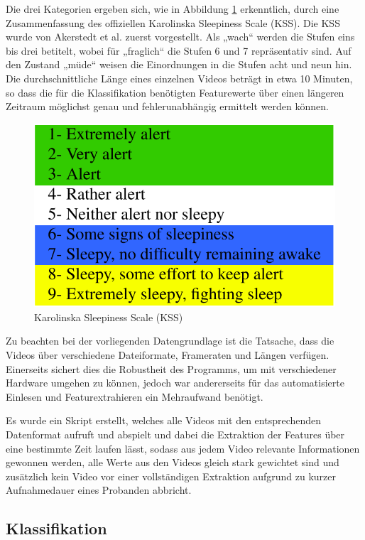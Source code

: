 Die drei Kategorien ergeben sich, wie in Abbildung \ref{fig:KSSScale} erkenntlich, durch eine Zusammenfassung des offiziellen Karolinska Sleepiness Scale (KSS). Die KSS wurde von Akerstedt et al. \cite{AK90} zuerst vorgestellt. Als „wach“ werden die Stufen eins bis drei betitelt, wobei für „fraglich“ die Stufen 6 und 7 repräsentativ sind. Auf den Zustand „müde“ weisen die Einordnungen in die Stufen acht und neun hin. Die durchschnittliche Länge eines einzelnen Videos beträgt in etwa 10 Minuten, so dass die für die Klassifikation benötigten Featurewerte über einen längeren Zeitraum möglichst genau und fehlerunabhängig ermittelt werden können. 

\begin{figure}
\centering
\includegraphics[scale=0.6]{images/KSSScale.png}
\caption{Karolinska Sleepiness Scale (KSS)}
\label{fig:KSSScale}
\end{figure}

Zu beachten bei der vorliegenden Datengrundlage ist die Tatsache, dass die Videos über verschiedene Dateiformate, Frameraten und Längen verfügen. Einerseits sichert dies die Robustheit des Programms, um mit verschiedener Hardware umgehen zu können, jedoch war andererseits für das automatisierte Einlesen und Featurextrahieren ein Mehraufwand benötigt. 

Es wurde ein Skript erstellt, welches alle Videos mit den entsprechenden Datenformat aufruft und abspielt und dabei die Extraktion der Features über eine bestimmte Zeit laufen lässt, sodass aus jedem Video relevante Informationen gewonnen werden, alle Werte aus den Videos gleich stark gewichtet sind und zusätzlich kein Video vor einer vollständigen Extraktion aufgrund zu kurzer Aufnahmedauer eines Probanden abbricht.


\subsection{Klassifikation}
\label{sec:classification}

